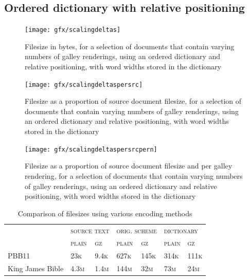 \subsection{Ordered dictionary with relative positioning}

\begin{figure}
  \begin{center}
  \texttt{[image: gfx/scalingdeltas]}
  \end{center}
  \caption[Filesize versus number of renderings, using relative positioning]{Filesize in bytes, for a selection of documents that contain varying numbers of galley renderings, using an ordered dictionary and relative positioning, with word widths stored in the dictionary}
  \label{fig:sizescaledeltas}
\end{figure}

\begin{figure}
  \begin{center}
  \texttt{[image: gfx/scalingdeltaspersrc]}
  \end{center}
  \caption[Filesize as a proportion of source document size, versus number of renderings, using relative positioning]{Filesize as a proportion of source document filesize, for a selection of documents that contain varying numbers of galley renderings, using an ordered dictionary and relative positioning, with word widths stored in the dictionary}
  \label{fig:sizescaledeltaspersrc}
\end{figure}

\begin{figure}
  \begin{center}
  \texttt{[image: gfx/scalingdeltaspersrcpern]}
  \end{center}
  \caption[Filesize as a proportion of source document size, per rendering, versus number of renderings, using relative positioning]{Filesize as a proportion of source document filesize and per galley rendering, for a selection of documents that contain varying numbers of galley renderings, using an ordered dictionary and relative positioning, with word widths stored in the dictionary}
  \label{fig:sizescaledeltaspersrcpern}
\end{figure}

\begin{table}
    \myfloatalign
  \begin{tabularx}{\textwidth}{lXXXXXX} %
    & \multicolumn{2}{l}{\textsc{source text}} & \multicolumn{2}{l}{\textsc{orig. scheme}} & \multicolumn{2}{l}{\textsc{dictionary}} \\
    & \textsc{plain} & \textsc{gz} & \textsc{plain} & \textsc{gz} & \textsc{plain} & \textsc{gz} \\ \midrule
    PBB11~\cite{Pinkney2011} & 23\textsc{k} & 9.4\textsc{k} & 627\textsc{k} & 145\textsc{k} & 314\textsc{k} & 111\textsc{k} \\ \midrule
    King James Bible & 4.3\textsc{m} & 1.4\textsc{m} & 144\textsc{m} & 32\textsc{m} & 73\textsc{m} & 24\textsc{m} \\ 
    \bottomrule
  \end{tabularx}
  \caption[Comparison of filesizes]{Comparison of filesizes using various encoding methods}  \label{tab:filesize}
\end{table}